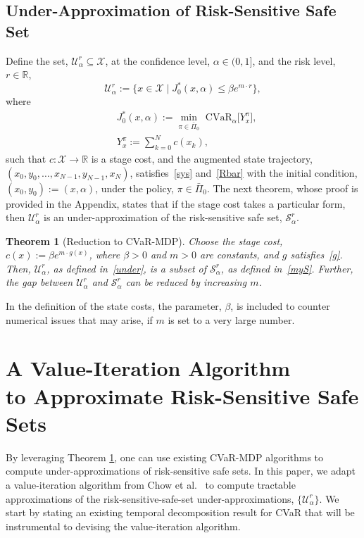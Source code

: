 \documentclass[letterpaper, 10 pt, conference]{ieeeconf}  %
\newtheorem{theorem}{Theorem}
\begin{document}
\subsection{Under-Approximation of Risk-Sensitive Safe Set}
Define the set, $\mathcal{U}_\alpha^r \subseteq \mathcal{X}$,
at the confidence level, $\alpha \in (0,1]$, and the risk level, $r \in \mathbb{R}$,
%
\begin{equation}\label{under}
\mathcal{U}_\alpha^r := \{x \in \mathcal{X} \mid J_0^*(x,\alpha) \leq \beta e^{m\cdot r} \},
\end{equation}
%
where
%
\begin{equation}\begin{aligned}
& J_0^*(x,\alpha) := {\underset{\pi \in \bar{\Pi}_0}\min} \text{ CVaR}_\alpha \big[ Y_x^\pi \big],\\
& Y_x^\pi := \textstyle\sum_{k=0}^N c(x_k),
\end{aligned}\label{J0}\end{equation}
%
such that $c : \mathcal{X} \to \mathbb{R}$ is a stage cost, and the augmented state trajectory, $(x_0, y_0, \dots, x_{N-1}, y_{N-1}, x_N)$,
satisfies~\eqref{sys} and~\eqref{Rbar} with the initial condition, $(x_0, y_0) := (x, \alpha)$, under the policy, $\pi \in \bar{\Pi}_0$.
The next theorem, whose proof is provided in the Appendix, states that if the stage cost takes a particular form, then $\mathcal{U}_\alpha^r$ is an under-approximation of the risk-sensitive safe set, $\mathcal{S}_\alpha^r$.   
\begin{theorem}[Reduction to CVaR-MDP]\label{lemma2}
Choose the stage cost, $c(x) := \beta e^{m\cdot g(x)}$, where $\beta > 0$ and $m > 0$ are constants, and $g$ satisfies~\eqref{g}.
Then, $\mathcal{U}_\alpha^r$, as defined in~\eqref{under}, is a subset of $\mathcal{S}_\alpha^r$, as defined in~\eqref{myS}. 
Further, the gap between $\mathcal{U}_\alpha^r$ and $\mathcal{S}_\alpha^r$ can be reduced by increasing $m$.
\end{theorem}

In the definition of the state costs, the parameter, $\beta$, is included to counter numerical issues that may arise, if $m$ is set to a very large number.
%
%
%
\section{A Value-Iteration Algorithm \\to Approximate Risk-Sensitive Safe Sets}\label{sec::alg}
By leveraging Theorem \ref{lemma2}, one can use existing CVaR-MDP algorithms to compute under-approximations of risk-sensitive safe sets. 
In this paper, we adapt a value-iteration algorithm from Chow et al.~\cite{chow2015risk} to compute tractable approximations 
of the risk-sensitive-safe-set under-approximations, $\{\mathcal{U}_{\alpha}^r\}$. 
We start by stating an existing temporal decomposition result for CVaR that will be instrumental to devising the value-iteration algorithm. 
%
\end{document}
